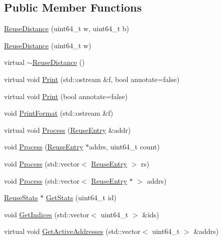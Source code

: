 \subsection*{Public Member Functions}
\begin{DoxyCompactItemize}
\item 
\hyperlink{class_reuse_distance_a0248afa697da0f6c87c6fd30c289ecc6}{ReuseDistance} (uint64\_\-t w, uint64\_\-t b)
\item 
\hyperlink{class_reuse_distance_ab68a2d9df5c28571c3f8820c5344b2c1}{ReuseDistance} (uint64\_\-t w)
\item 
virtual \hyperlink{class_reuse_distance_a2846a6f2c045759657b754838045900d}{$\sim$ReuseDistance} ()
\item 
virtual void \hyperlink{class_reuse_distance_ae693ec30500fcdd2222f0f07d207c0ce}{Print} (std::ostream \&f, bool annotate=false)
\item 
virtual void \hyperlink{class_reuse_distance_a2ce354238975243f602201787c9282ba}{Print} (bool annotate=false)
\item 
void \hyperlink{class_reuse_distance_a027a92a58a6639e8ed13a7490d11dcf5}{PrintFormat} (std::ostream \&f)
\item 
virtual void \hyperlink{class_reuse_distance_a4ff6b77022ce62e0fdefa5cc297b932a}{Process} (\hyperlink{struct_reuse_entry}{ReuseEntry} \&addr)
\item 
void \hyperlink{class_reuse_distance_aed9cbdd99de67972a37de4624614de9d}{Process} (\hyperlink{struct_reuse_entry}{ReuseEntry} $\ast$addrs, uint64\_\-t count)
\item 
void \hyperlink{class_reuse_distance_a372960c10d5fb6552c8dfcfd77da38ba}{Process} (std::vector$<$ \hyperlink{struct_reuse_entry}{ReuseEntry} $>$ rs)
\item 
void \hyperlink{class_reuse_distance_a88052f5ae1e69bab8fe1f9b7b87c1037}{Process} (std::vector$<$ \hyperlink{struct_reuse_entry}{ReuseEntry} $\ast$ $>$ addrs)
\item 
\hyperlink{class_reuse_stats}{ReuseStats} $\ast$ \hyperlink{class_reuse_distance_a771580c25dc5140969919e959e2ebdd1}{GetStats} (uint64\_\-t id)
\item 
void \hyperlink{class_reuse_distance_a99fb4b3aae663676515ad354691b7cc6}{GetIndices} (std::vector$<$ uint64\_\-t $>$ \&ids)
\item 
virtual void \hyperlink{class_reuse_distance_acc4885040a8a518fc10b5aa4da7d777a}{GetActiveAddresses} (std::vector$<$ uint64\_\-t $>$ \&addrs)
\end{DoxyCompactItemize}
